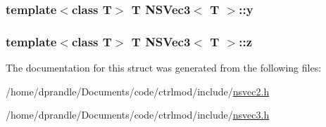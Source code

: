 \hypertarget{structNSVec3_a5498f3161922dedec454c81ab4e54ae3}{
\subsubsection[{y}]{\setlength{\rightskip}{0pt plus 5cm}template$<$class T$>$ T {\bf N\-S\-Vec3}$<$ T $>$\-::y}}\label{structNSVec3_a5498f3161922dedec454c81ab4e54ae3}
\hypertarget{structNSVec3_a6731c5158baf48408a4311b6b13aafb3}{
\subsubsection[{z}]{\setlength{\rightskip}{0pt plus 5cm}template$<$class T$>$ T {\bf N\-S\-Vec3}$<$ T $>$\-::z}}\label{structNSVec3_a6731c5158baf48408a4311b6b13aafb3}


The documentation for this struct was generated from the following files\-:\begin{DoxyCompactItemize}
\item 
/home/dprandle/\-Documents/code/ctrlmod/include/\hyperlink{nsvec2_8h}{nsvec2.\-h}\item 
/home/dprandle/\-Documents/code/ctrlmod/include/\hyperlink{nsvec3_8h}{nsvec3.\-h}\end{DoxyCompactItemize}
